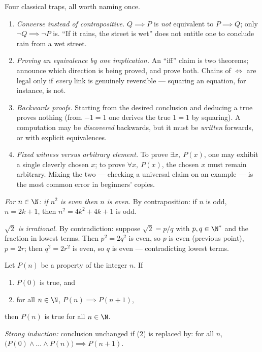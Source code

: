 \begin{remark}\label{rem:b1:logic:pitfalls}
Four classical traps, all worth naming once.
\begin{enumerate}
  \item \emph{Converse instead of contrapositive.} $Q \implies P$
        is \emph{not} equivalent to $P \implies Q$; only $\lnot Q
        \implies \lnot P$ is. ``If it rains, the street is wet''
        does not entitle one to conclude rain from a wet street.
  \item \emph{Proving an equivalence by one implication.} An
        ``iff'' claim is two theorems; announce which direction is
        being proved, and prove both. Chains of $\iff$ are legal
        only if \emph{every} link is genuinely reversible ---
        squaring an equation, for instance, is not.
  \item \emph{Backwards proofs.} Starting from the desired
        conclusion and deducing a true  proves nothing
        (from $-1 = 1$ one derives the true $1 = 1$ by squaring).
        A computation may be \emph{discovered} backwards, but it
        must be \emph{written} forwards, or with explicit
        equivalences.
  \item \emph{Fixed witness versus arbitrary element.} To prove
        $\exists x,\ P(x)$, one may exhibit a single cleverly
        chosen $x$; to prove $\forall x,\ P(x)$, the chosen $x$
        must remain arbitrary. Mixing the two --- checking a
        universal claim on an example --- is the most common
        error in beginners' copies.
\end{enumerate}
\end{remark}

\begin{example}\label{ex:b1:logic:sqrt2}
\emph{For $n \in \N$: if $n^2$ is even then $n$ is even.} By
contraposition: if $n$ is odd, $n = 2k+1$, then
$n^2 = 4k^2 + 4k + 1$ is odd.

\emph{$\sqrt 2$ is irrational.} By contradiction: suppose
$\sqrt 2 = p/q$ with $p, q \in \N^*$ and the fraction in lowest terms.
Then $p^2 = 2q^2$ is even, so $p$ is even (previous point), $p = 2r$;
then $q^2 = 2r^2$ is even, so $q$ is even --- contradicting lowest
terms.
\end{example}

\begin{theorem}[Induction]\label{thm:b1:logic:induction}
Let $P(n)$ be a property of the integer $n$. If
\begin{enumerate}
  \item $P(0)$ is true, and
  \item for all $n \in \N$, $P(n) \implies P(n+1)$,
\end{enumerate}
then $P(n)$ is true for all $n \in \N$.

\emph{Strong induction:} conclusion unchanged if (2) is replaced by:
for all $n$, $\bigl(P(0) \land \dots \land P(n)\bigr) \implies
P(n+1)$.
\end{theorem}

